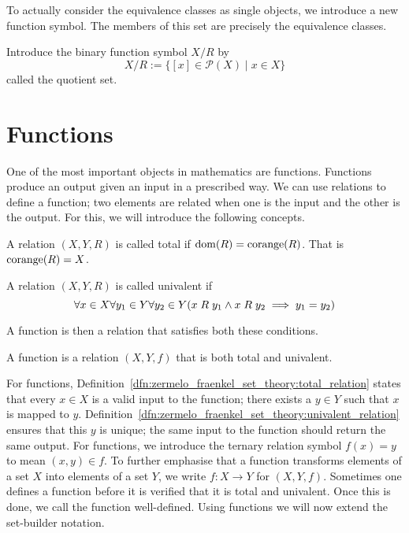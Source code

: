 \documentclass[../main.tex]{subfiles}
\begin{document}
To actually consider the equivalence classes as single objects, we introduce a new function symbol. The members of this set are precisely the equivalence classes.
\begin{definition}
    Introduce the binary function symbol $X/R$ by
    \begin{equation*}
        X/R:=\{[x]\in\mathcal{P}(X)\mid x\in X\}
    \end{equation*}
    called the quotient set.
\end{definition}

\section{Functions}\label{sec:zermelo_fraenkel_set_theory:functions}
One of the most important objects in mathematics are functions. Functions produce an output given an input in a prescribed way. We can use relations to define a function; two elements are related when one is the input and the other is the output. For this, we will introduce the following concepts.
\begin{definition}\label{dfn:zermelo_fraenkel_set_theory:total_relation}
    A relation $(X,Y,R)$ is called total if $\dom(R)\linebreak=\corange(R)$. That is $\operatorname{corange}(R)=X$.
\end{definition}
\begin{definition}\label{dfn:zermelo_fraenkel_set_theory:univalent_relation}
    A relation $(X,Y,R)$ is called univalent if
    \begin{equation*}
        \forall x\in X\forall y_1\in Y\forall y_2\in Y(x\mathrel{R} y_1\land x\mathrel{R} y_2\implies y_1=y_2)
    \end{equation*}
\end{definition}
A function is then a relation that satisfies both these conditions.
\begin{definition}[Function]
    A function is a relation $(X,Y,f)$ that is both total and univalent.
\end{definition}
For functions, Definition~\ref{dfn:zermelo_fraenkel_set_theory:total_relation} states that every $x\in X$ is a valid input to the function; there exists a $y\in Y$ such that $x$ is mapped to $y$. Definition~\ref{dfn:zermelo_fraenkel_set_theory:univalent_relation} ensures that this $y$ is unique; the same input to the function should return the same output. For functions, we introduce the ternary relation symbol $f(x)=y$ to mean $(x,y)\in f$. To further emphasise that a function transforms elements of a set $X$ into elements of a set $Y$, we write $f:X\to Y$ for $(X,Y,f)$. Sometimes one defines a function before it is verified that it is total and univalent. Once this is done, we call the function well-defined. Using functions we will now extend the set-builder notation.
\end{document}
